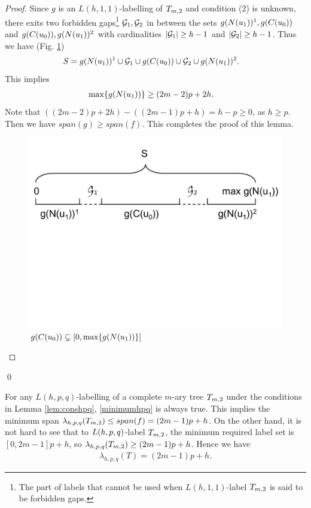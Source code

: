 \begin{proof}
Since $g$ is an $L(h,1,1)$-labelling of $\tm2$ and condition (2) is unknown, there exits two forbidden gaps\footnote{The part of labels that cannot be used when $L(h,1,1)$-label $\tm2$ is said to be forbidden gaps.} ${\cal G}_1, {\cal G}_2$ in between the sets $g(N(u_1))^1, g(C(u_0))$ and $g(C(u_0)), g(N(u_1))^2$ with cardinalities $|{\cal G}_1| \ge h-1$ and $|{\cal G}_2| \ge h-1$. Thus we have (Fig. \ref{case2.2})
\begin{align*}
S &= g(N(u_1))^1 \cup {\cal G}_1 \cup g(C(u_0)) \cup {\cal G}_2 \cup g(N(u_1))^2. 
\end{align*}
This implies 
\begin{align*}
\max\{g(N(u_1))\}
&\ge (2m-2)p+2h.
\end{align*}
Note that $((2m-2)p+2h) - ((2m-1)p+h) = h-p \ge 0$, as $h \ge p$. Then we have $span(g) \ge span(f)$. This completes the proof of this lemma. 
\begin{figure}
\centering
      \vspace{-5pt}
    \includegraphics[scale=0.4]{../figures/fig3-4.pdf}
        \vspace{-110pt}
\caption{$g(C(u_0)) \subsetneq [0, \max\{g(N(u_1))\}]$}
\label{case2.2}
\end{figure}
\end{proof}
\qed


\begin{remark}
\label{hpqtm2}
For any $L(h,p,q)$-labelling of a complete $m$-ary tree $\tm2$ under the conditions in Lemma \ref{lem:conshpq}, \eqref{minimumhpq} is always true. This implies the minimum span $\lamhpq(\tm2) \le span(f) = (2m-1)p+h$. On the other hand, it is not hard to see that to $L(h,p,q)$-label $\tm2$, the minimum required label set is $[0, 2m-1]p+h$, so $\lambda_{h,p,q}(\tm2) \ge (2m-1)p+h$. Hence we have  
\begin{align}
\label{minispanhpq}
\lambda_{h,p,q}(T) = (2m-1)p+h.
\end{align}

\end{remark}


